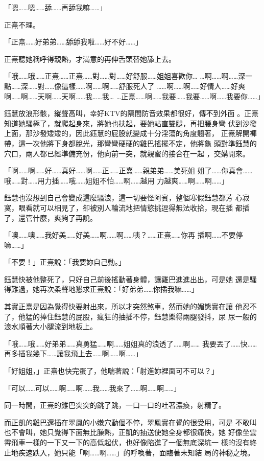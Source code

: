 「嗯……嗯……舔……再舔我嘛……」

正熹不理。

「正熹……好弟弟……舔舔我啦……好不好……」

正熹聽她稱呼得親熱，才滿意的再伸舌頭替她舔上去。

「哦……哦……正熹……正熹……對……對……好舒服……姐姐喜歡你…
…啊……啊……深一點……深……對……像這樣……啊……啊……舒服死人了
……啊……啊……好情人……好爽啊……啊……天啊……天啊……我……我…
…正熹……啊……我要……我要……啊……我要你……」

鈺慧放浪形骸，縱聲高叫，幸好KTV的隔間防音效果都很好，傳不到外面
。正熹知道她騷極了，就爬起身來，將她也扶起，要她站直雙腿，再把腰身彎
伏到沙發上面，那沙發矮矮的，因此鈺慧的屁股就變成十分淫蕩的角度翹著，
正熹解開褲帶，這一次他將下身都脫光，那彎彎硬硬的雞巴搖擺不定，他將龜
頭對準鈺慧的穴口，兩人都已經準備充份，他向前一突，就親蜜的接合在一起
，交媾開來。

「啊……啊……好……真好……啊……正……正熹……親弟弟……美死姐
姐了……你真會……哦……對……用力插……哦……姐姐不怕……啊……越用
力越爽……啊……啊……」

鈺慧也沒想到自己會變成這麼騷浪，這一切要怪阿賓，整個寒假鈺慧都芳
心寂寞，眼看就可以相見了，卻被別人輪流地把情慾挑逗得無法收拾，現在插
都插了，還管什麼，爽夠了再說。

「噢……噢……我好美……好美……啊……啊……咦？……正熹……你再
插啊……不要停嘛……」

「不要！」正熹說：「我要妳自己動。」

鈺慧快被他整死了，只好自己前後搖動著身體，讓雞巴進進出出，可是她
還是騷得難過，她再次柔聲地懇求正熹說：「好弟弟……你插我嘛……」

其實正熹是因為覺得快要射出來，所以才突然煞車，然而她的媚態實在讓
他忍不了，他猛的捧住鈺慧的屁股，瘋狂的抽插不停，鈺慧樂得兩腿發抖，尿
尿一般的浪水順著大小腿流到地板上。

「哦……哦……好弟弟……真勇猛……啊……姐姐真的浪透了……啊……
我要丟了……快……再多插我幾下……讓我飛上去……啊……啊……」

「好姐姐，」正熹也快完蛋了，他喘著說：「射進妳裡面可不可以？」

「可以……可以……啊……啊……我……我來了……啊……啊……」

同一時間，正熹的雞巴突突的跳了跳，一口一口的吐著濃痰，射精了。

而正凱的雞巴還插在翠鳳的小嫩穴動個不停，翠鳳實在覺的很受用，可是
不敢叫也不會叫，她只覺得下面無比臊熱，正凱的抽送使她全身都很痛快，她
好像坐雲霄飛車一樣的一下又一下的高低起伏，也好像陷進了一個無底深坑一
樣的沒有終止地疾速跌入，她只能「啊……啊……」的呼喚著，面臨著未知結
局的神秘之境。

